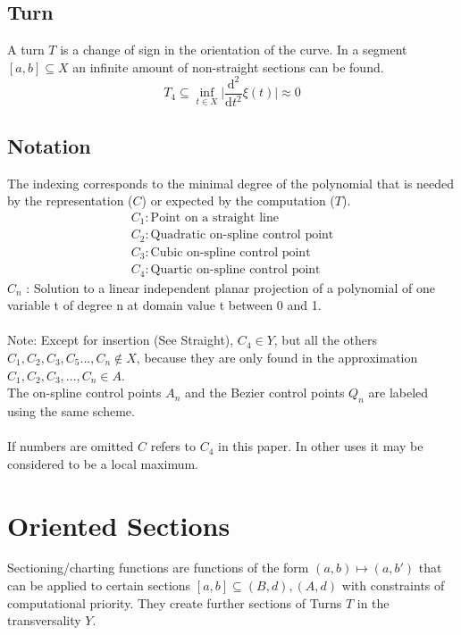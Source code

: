 \documentclass{report}
\begin{document}
\subsection{Turn}
A turn $T$ is a change of sign in the orientation of the curve. In a segment $[a,b] \subseteq X$ an infinite amount of non-straight sections can be found.
\begin{equation}
T_{4} \subseteq \inf_{t \in X} \lvert \frac{\mathrm{d}^2}{\mathrm{d}t^2}\xi(t) \rvert \approx 0
\end{equation}

\subsection{Notation}
The indexing corresponds to the minimal degree of the polynomial that is needed by the representation ($C$) or expected by the computation ($T$).
\begin{align}
C_{1} : \text{Point on a straight line}\\
C_{2} : \text{Quadratic on-spline control point}\\
C_{3} : \text{Cubic on-spline control point}\\
C_{4} : \text{Quartic on-spline control point}
\end{align}
$C_{n}$ : Solution to a linear independent planar projection of a polynomial of one variable t of degree n at domain value t between 0 and 1.\\\\
Note: Except for insertion (See Straight), $C_{4} \in Y$, but all the others $C_{1},C_{2},C_{3},C_{5}...,C_{n} \not\in X$, because they are only found in the approximation $C_{1},C_{2},C_{3},...,C_{n} \in A$.\\
The on-spline control points $A_{n}$ and the Bezier control points $Q_{n}$ are labeled using the same scheme.\\\\
If numbers are omitted $C$ refers to $C_{4}$ in this paper. In other uses it may be considered to be a local maximum.

\section*{Oriented Sections}
Sectioning/charting functions are functions of the form $(a,b) \mapsto (a,b')$ that can be applied to certain sections $[a,b] \subseteq (B,d),(A,d)$ with constraints of computational priority. They create further sections of Turns $T$ in the transversality $Y$.
\end{document}
